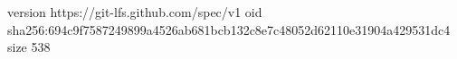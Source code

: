 version https://git-lfs.github.com/spec/v1
oid sha256:694c9f7587249899a4526ab681bcb132c8e7c48052d62110e31904a429531dc4
size 538
